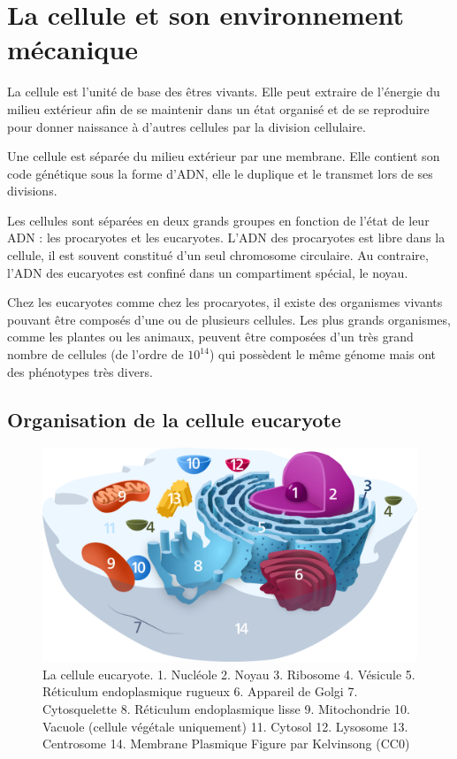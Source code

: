 %
%
%

%
\chapter{La cellule et son environnement mécanique}


La cellule est l'unité de base des êtres vivants. Elle peut extraire de l'énergie du milieu extérieur afin de se maintenir dans un état organisé et de se reproduire pour donner naissance à d'autres cellules par la division cellulaire. 

Une cellule est séparée du milieu extérieur par une membrane. Elle contient son code génétique sous la forme d'ADN, elle le duplique et le transmet lors de ses divisions. 

Les cellules sont séparées en deux grands groupes en fonction de l'état de leur ADN : les procaryotes et les eucaryotes. 
L'ADN des procaryotes est libre dans la cellule, il est souvent constitué d'un seul chromosome circulaire. 
Au contraire, l'ADN des eucaryotes est confiné dans un compartiment spécial, le noyau. 

Chez les eucaryotes comme chez les procaryotes, il existe des organismes vivants pouvant être composés d'une ou de plusieurs cellules. 
Les plus grands organismes, comme les plantes ou les animaux, peuvent être composées d'un très grand nombre de cellules (de l'ordre de $10^{14}$) qui possèdent le même génome mais ont des phénotypes très divers. 

\section{Organisation de la cellule eucaryote}
\begin{figure}[h!]
\includegraphics[scale=0.2]{Animal_Cell.png}
\caption{La cellule eucaryote. 
1. Nucléole
2. Noyau
3. Ribosome
4. Vésicule
5. Réticulum endoplasmique rugueux
6. Appareil de Golgi
7. Cytosquelette
8. Réticulum endoplasmique lisse
9. Mitochondrie
10. Vacuole (cellule végétale uniquement)
11. Cytosol
12. Lysosome
13. Centrosome
14. Membrane Plasmique
Figure par Kelvinsong (CC0)}
\end{figure}


